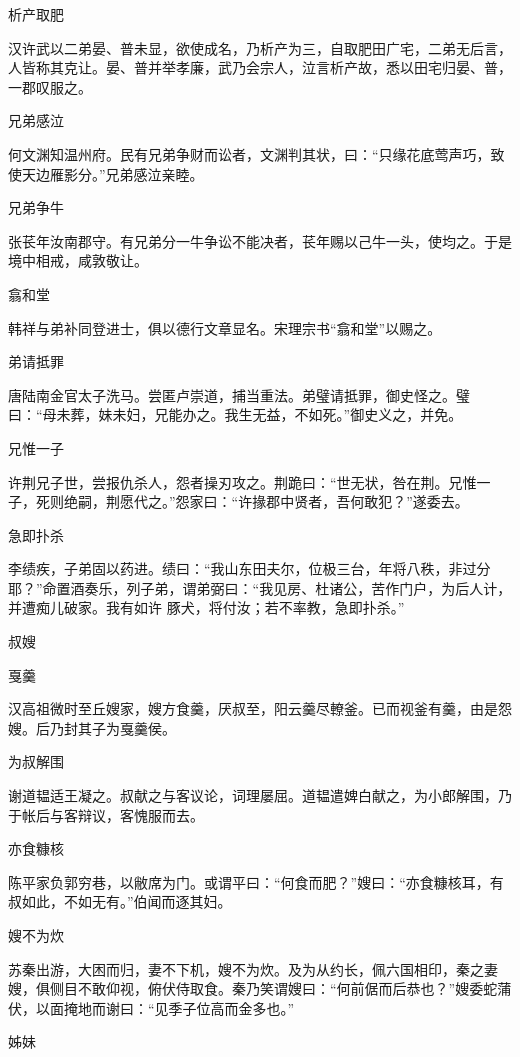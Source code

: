 \documentclass[a4paper,12pt,UTF8,twoside]{ctexbook}
\begin{document}
    析产取肥
    
    汉许武以二弟晏、普未显，欲使成名，乃析产为三，自取肥田广宅，二弟无后言，人皆称其克让。晏、普并举孝廉，武乃会宗人，泣言析产故，悉以田宅归晏、普，一郡叹服之。
    
    兄弟感泣
    
    何文渊知温州府。民有兄弟争财而讼者，文渊判其状，曰：“只缘花底莺声巧，致使天边雁影分。”兄弟感泣亲睦。
    
    兄弟争牛
    
    张苌年汝南郡守。有兄弟分一牛争讼不能决者，苌年赐以己牛一头，使均之。于是境中相戒，咸敦敬让。
    
    翕和堂
    
    韩祥与弟补同登进士，俱以德行文章显名。宋理宗书“翕和堂”以赐之。
    
    弟请抵罪
    
    唐陆南金官太子洗马。尝匿卢崇道，捕当重法。弟璧请抵罪，御史怪之。璧曰：“母未葬，妹未妇，兄能办之。我生无益，不如死。”御史义之，并免。
    
    兄惟一子
    
    许荆兄子世，尝报仇杀人，怨者操刃攻之。荆跪曰：“世无状，咎在荆。兄惟一子，死则绝嗣，荆愿代之。”怨家曰：“许掾郡中贤者，吾何敢犯？”遂委去。
    
    急即扑杀
    
    李绩疾，子弟固以药进。绩曰：“我山东田夫尔，位极三台，年将八秩，非过分耶？”命置酒奏乐，列子弟，谓弟弼曰：“我见房、杜诸公，苦作门户，为后人计，并遭痴儿破家。我有如许 豚犬，将付汝；若不率教，急即扑杀。”
    
    叔嫂
    
    戛羹
    
    汉高祖微时至丘嫂家，嫂方食羹，厌叔至，阳云羹尽轑釜。已而视釜有羹，由是怨嫂。后乃封其子为戛羹侯。
    
    为叔解围
    
    谢道韫适王凝之。叔献之与客议论，词理屡屈。道韫遣婢白献之，为小郎解围，乃于帐后与客辩议，客愧服而去。
    
    亦食糠核
    
    陈平家负郭穷巷，以敝席为门。或谓平曰：“何食而肥？”嫂曰：“亦食糠核耳，有叔如此，不如无有。”伯闻而逐其妇。
    
    嫂不为炊
    
    苏秦出游，大困而归，妻不下机，嫂不为炊。及为从约长，佩六国相印，秦之妻嫂，俱侧目不敢仰视，俯伏侍取食。秦乃笑谓嫂曰：“何前倨而后恭也？”嫂委蛇蒲伏，以面掩地而谢曰：“见季子位高而金多也。”
    
    姊妹
    
\end{document}
